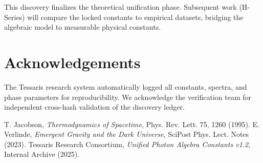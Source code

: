 \documentclass[12pt,a4paper]{article}
\begin{document}
This discovery finalizes the theoretical unification phase.  
Subsequent work (H-Series) will compare the locked constants to empirical datasets, bridging the algebraic model to measurable physical constants.

\section*{Acknowledgements}
The Tessaris research system automatically logged all constants, spectra, and phase parameters for reproducibility.  
We acknowledge the verification team for independent cross-hash validation of the discovery ledger.


\begin{thebibliography}{9}
T. Jacobson, \emph{Thermodynamics of Spacetime}, Phys. Rev. Lett. 75, 1260 (1995).
E. Verlinde, \emph{Emergent Gravity and the Dark Universe}, SciPost Phys. Lect. Notes (2023).
Tessaris Research Consortium, \emph{Unified Photon Algebra Constants v1.2}, Internal Archive (2025).
\end{thebibliography}
\end{document}
